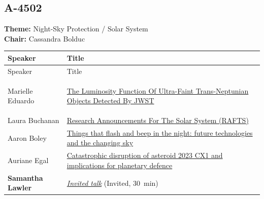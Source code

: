 \subsection*{A-4502}
\textbf{Theme:} Night-Sky Protection / Solar System\\
\textbf{Chair:} Cassandra Bolduc\\
{\small
{}
\sloppy
\setlength{\emergencystretch}{1em}
\begin{longtable}{@{}>{\TableRaggedRight\arraybackslash\hspace{0pt}}p{} >{\TableRaggedRight\arraybackslash\hspace{0pt}}p{}@{}}
\toprule
Speaker & Title \\
\midrule
\endfirsthead
\toprule
Speaker & Title \\
\midrule
\endhead
\hypertarget{schedule-talk-319}{}\label{schedule-page-talk-319}Marielle Eduardo & \hyperlink{abstract-talk-319}{The Luminosity Function Of Ultra-Faint Trans-Neptunian Objects Detected By JWST} \\
\hypertarget{schedule-talk-244}{}\label{schedule-page-talk-244}Laura Buchanan & \hyperlink{abstract-talk-244}{Research Announcements For The Solar System (RAFTS)} \\
\hypertarget{schedule-talk-305}{}\label{schedule-page-talk-305}Aaron Boley & \hyperlink{abstract-talk-305}{Things that flash and beep in the night: future technologies and the changing sky} \\
\hypertarget{schedule-talk-177}{}\label{schedule-page-talk-177}Auriane Egal & \hyperlink{abstract-talk-177}{Catastrophic disruption of asteroid 2023 CX1 and implications for planetary defence} \\
\hypertarget{invited-samantha-lawler-sched}{}\label{invited-page-samantha-lawler-sched}{\bfseries\color{cascagold}Samantha Lawler} & \hyperlink{invited-samantha-lawler}{\emph{Invited talk}} {\small\color{cascagold}(Invited, 30~min)} \\
\bottomrule
\end{longtable}
}
